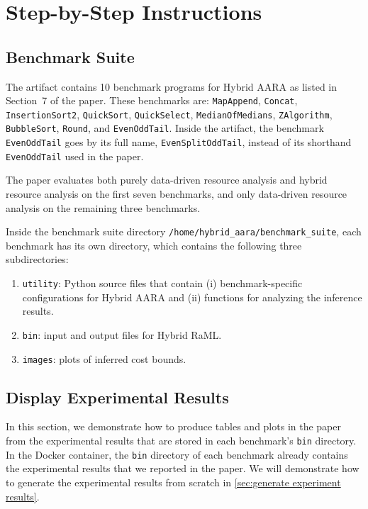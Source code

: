 
\section{Step-by-Step Instructions}

\subsection{Benchmark Suite}

The artifact contains 10 benchmark programs for Hybrid AARA as listed in
Section~7 of the paper.
%
These benchmarks are: \texttt{MapAppend}, \texttt{Concat},
\texttt{InsertionSort2}, \texttt{QuickSort}, \texttt{QuickSelect},
\texttt{MedianOfMedians}, \texttt{ZAlgorithm}, \texttt{BubbleSort},
\texttt{Round}, and \texttt{EvenOddTail}.
%
Inside the artifact, the benchmark \texttt{EvenOddTail} goes by its full name,
\texttt{EvenSplitOddTail}, instead of its shorthand \texttt{EvenOddTail} used
in the paper.

The paper evaluates both purely data-driven resource analysis and hybrid
resource analysis on the first seven benchmarks, and only data-driven resource
analysis on the remaining three benchmarks.

Inside the benchmark suite directory \texttt{/home/hybrid\_aara/benchmark\_suite},
each benchmark has its own directory, which contains the following three
subdirectories:
\begin{enumerate}
  \item \texttt{utility}: Python source files that contain (i)
        benchmark-specific configurations for Hybrid AARA and (ii) functions for
        analyzing the inference results.
  \item \texttt{bin}: input and output files for Hybrid RaML.
  \item \texttt{images}: plots of inferred cost bounds.
\end{enumerate}

\subsection{Display Experimental Results}
\label{sec:display experiment results}

In this section, we demonstrate how to produce tables and plots in the paper
from the experimental results that are stored in each benchmark's \texttt{bin}
directory.
%
In the Docker container, the \texttt{bin} directory of each benchmark already
contains the experimental results that we reported in the paper.
%
We will demonstrate how to generate the experimental results from scratch in
\cref{sec:generate experiment results}.

